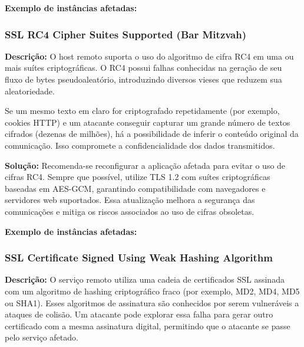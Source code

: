 \documentclass[a4paper,12pt]{article}
\begin{document}
\textbf{Exemplo de instâncias afetadas:}
\begin{itemize}
\end{itemize}


\subsubsection{SSL RC4 Cipher Suites Supported (Bar Mitzvah)}

\textbf{Descrição:}  
O host remoto suporta o uso do algoritmo de cifra RC4 em uma ou mais suítes criptográficas. O RC4 possui falhas conhecidas na geração de seu fluxo de bytes pseudoaleatório, introduzindo diversos vieses que reduzem sua aleatoriedade.  

Se um mesmo texto em claro for criptografado repetidamente (por exemplo, cookies HTTP) e um atacante conseguir capturar um grande número de textos cifrados (dezenas de milhões), há a possibilidade de inferir o conteúdo original da comunicação. Isso compromete a confidencialidade dos dados transmitidos.

\textbf{Solução:}  
Recomenda-se reconfigurar a aplicação afetada para evitar o uso de cifras RC4. Sempre que possível, utilize TLS 1.2 com suítes criptográficas baseadas em AES-GCM, garantindo compatibilidade com navegadores e servidores web suportados. Essa atualização melhora a segurança das comunicações e mitiga os riscos associados ao uso de cifras obsoletas.



\textbf{Exemplo de instâncias afetadas:}
\begin{itemize}
\end{itemize}

\subsubsection{SSL Certificate Signed Using Weak Hashing Algorithm}

\textbf{Descrição:}
O serviço remoto utiliza uma cadeia de certificados SSL assinada com um algoritmo de hashing criptográfico fraco (por exemplo, MD2, MD4, MD5 ou SHA1). Esses algoritmos de assinatura são conhecidos por serem vulneráveis a ataques de colisão. Um atacante pode explorar essa falha para gerar outro certificado com a mesma assinatura digital, permitindo que o atacante se passe pelo serviço afetado.
\end{document}
